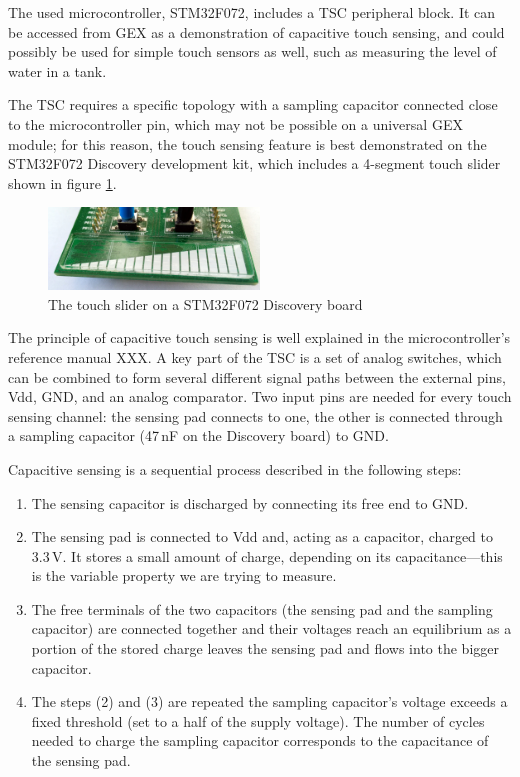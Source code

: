 The used microcontroller, STM32F072, includes a \gls{TSC} peripheral block. It can be accessed from GEX as a demonstration of capacitive touch sensing, and could possibly be used for simple touch sensors as well, such as measuring the level of water in a tank.

The TSC requires a specific topology with a sampling capacitor connected close to the microcontroller pin, which may not be possible on a universal GEX module; for this reason, the touch sensing feature is best demonstrated on the STM32F072 Discovery development kit, which includes a 4-segment touch slider shown in figure \ref{fig:disco-touch}.

\begin{figure}
	\centering
	\includegraphics[width=0.5\textwidth] {img/disco-touch.jpg}
	\caption{\label{fig:disco-touch}The touch slider on a STM32F072 Discovery board}
\end{figure}

The principle of capacitive touch sensing is well explained in the microcontroller's reference manual XXX. A key part of the \gls{TSC} is a set of analog switches, which can be combined to form several different signal paths between the external pins, Vdd, \gls{GND}, and an analog comparator. Two input pins are needed for every touch sensing channel: the sensing pad connects to one, the other is connected through a sampling capacitor  (47\,nF on the Discovery board) to \gls{GND}.

Capacitive sensing is a sequential process described in the following steps:

\begin{enumerate}
	\item The sensing capacitor is discharged by connecting its free end to \gls{GND}.
	\item The sensing pad is connected to Vdd and, acting as a capacitor, charged to 3.3\,V. It stores a small amount of charge, depending on its capacitance---this is the variable property we are trying to measure.
	\item The free terminals of the two capacitors (the sensing pad and the sampling capacitor) are connected together and their voltages reach an equilibrium as a portion of the stored charge leaves the sensing pad and flows into the bigger capacitor.
	\item The steps (2) and (3) are repeated the sampling capacitor's voltage exceeds a fixed threshold (set to a half of the supply voltage). The number of cycles needed to charge the sampling capacitor corresponds to the capacitance of the sensing pad.
\end{enumerate}

